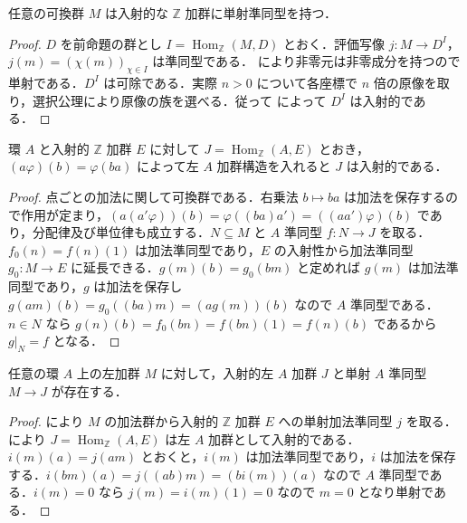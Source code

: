 \begin{prop}[可換群の入射加群への埋込み]
任意の可換群 $M$ は入射的な $\mathbb Z$ 加群に単射準同型を持つ．
\end{prop}
\begin{proof}
$D$ を前命題の群とし $I=\operatorname{Hom}_{\mathbb Z}(M,D)$ とおく．評価写像 $j:M\to D^I$，$j(m)=(\chi(m))_{\chi\in I}$ は準同型である． により非零元は非零成分を持つので単射である．$D^I$ は可除である．実際 $n>0$ について各座標で $n$ 倍の原像を取り，選択公理により原像の族を選べる．従って  によって $D^I$ は入射的である．
\end{proof}
\begin{prop}[整数加群からの入射加群]
環 $A$ と入射的 $\mathbb Z$ 加群 $E$ に対して $J=\operatorname{Hom}_{\mathbb Z}(A,E)$ とおき，$(a\varphi)(b)=\varphi(ba)$ によって左 $A$ 加群構造を入れると $J$ は入射的である．
\end{prop}
\begin{proof}
点ごとの加法に関して可換群である．右乗法 $b\mapsto ba$ は加法を保存するので作用が定まり，$(a(a'\varphi))(b)=\varphi((ba)a')=((aa')\varphi)(b)$ であり，分配律及び単位律も成立する．$N\subseteq M$ と $A$ 準同型 $f:N\to J$ を取る．$f_0(n)=f(n)(1)$ は加法準同型であり，$E$ の入射性から加法準同型 $g_0:M\to E$ に延長できる．$g(m)(b)=g_0(bm)$ と定めれば $g(m)$ は加法準同型であり，$g$ は加法を保存し $g(am)(b)=g_0((ba)m)=(ag(m))(b)$ なので $A$ 準同型である．$n\in N$ なら $g(n)(b)=f_0(bn)=f(bn)(1)=f(n)(b)$ であるから $g|_N=f$ となる．
\end{proof}
\begin{prop}[十分な入射加群の存在]
任意の環 $A$ 上の左加群 $M$ に対して，入射的左 $A$ 加群 $J$ と単射 $A$ 準同型 $M\to J$ が存在する．
\end{prop}
\begin{proof}
 により $M$ の加法群から入射的 $\mathbb Z$ 加群 $E$ への単射加法準同型 $j$ を取る． により $J=\operatorname{Hom}_{\mathbb Z}(A,E)$ は左 $A$ 加群として入射的である．$i(m)(a)=j(am)$ とおくと，$i(m)$ は加法準同型であり，$i$ は加法を保存する．$i(bm)(a)=j((ab)m)=(bi(m))(a)$ なので $A$ 準同型である．$i(m)=0$ なら $j(m)=i(m)(1)=0$ なので $m=0$ となり単射である．
\end{proof}

